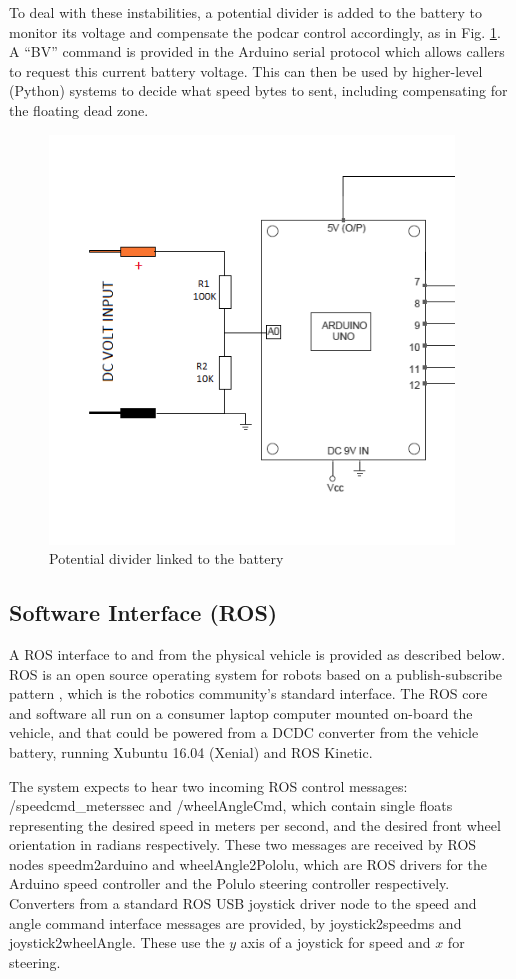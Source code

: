 \documentclass[a4paper]{article}
\begin{document}
	To deal with these instabilities, a potential divider is added to the battery to monitor its  voltage and compensate the podcar control accordingly, as in Fig. \ref{fig:potential_divider}. A ``BV'' command is provided in the Arduino serial protocol which allows callers to request this current battery voltage. This can then be used by higher-level (Python) systems to decide what speed bytes to sent, including compensating for the floating dead zone.
	
	\begin{figure}
		\centering
		\includegraphics[width=0.5\columnwidth]{hardware/potential_divider.png}
		\caption{Potential divider linked to the battery}
		\label{fig:potential_divider}
	\end{figure}
	
	\subsection{Software Interface (ROS)}
	
	A ROS interface to and from the physical vehicle is provided as described below. ROS is an open source operating system for robots based on a publish-subscribe pattern \cite{quigley2009ros}, which is the robotics community’s standard interface. The ROS core and software all run on a consumer laptop computer mounted on-board the vehicle, and that could be powered from a DCDC converter from the vehicle battery, running Xubuntu 16.04 (Xenial) and ROS Kinetic. 
	
	The system expects to hear two incoming ROS control messages: /speedcmd\_meterssec and /wheelAngleCmd, which contain single floats representing the desired speed in meters per second, and the desired front wheel orientation in radians respectively. These two messages are received by ROS nodes speedm2arduino and wheelAngle2Pololu, which are ROS drivers for the Arduino speed controller and the Polulo steering controller respectively. Converters from a standard ROS USB joystick driver node to the speed and angle command interface messages are provided, by joystick2speedms and joystick2wheelAngle. These use the $y$ axis of a joystick for speed and $x$ for steering.
	
\end{document}
